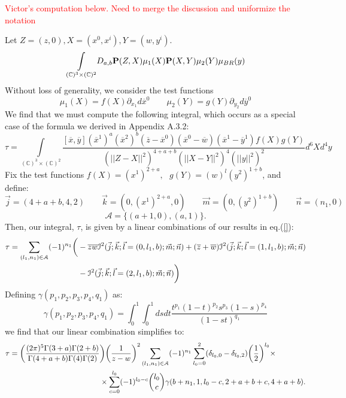 \documentclass[../main.tex]{subfiles}
\begin{document}
\textcolor{red}{Victor's computation below. Need to merge the discussion and uniformize the notation}

Let $Z = (z,0), X = (x^0, x^i), Y = (w, y^i) $.
\begin{equation}
    \underset{(\mathbb{C})^3 \times (\mathbb{C})^2}{\int} D_{a,b} \bold{P}(Z,X) \mu_1(X) \bold{P}(X,Y) \mu_2(Y) \mu_{BR}(y)
\end{equation}
Without loss of generality, we consider the test functions
\begin{equation}
    \mu_1(X) = f(X) \partial_{x_1} d\overline{x}^0 \quad \quad \mu_2(Y) = g(Y) \partial_{y_2} d\overline{y}^0
\end{equation}
We find that we must compute the following integral, which occurs as a special case of
the formula we derived in Appendix A.3.2:
\begin{equation}
    \tau = \underset{(\mathbb{C})^3 \times (\mathbb{C})^2}{\int} \frac{[\overline{x}, \overline{y}] (\overline{x}^1)^a (\overline{x}^2)^b (\overline{z}-\overline{x}^0) (\overline{x}^0 - \overline{w})(\overline{x}^1-\overline{y}^1) f(X) g(Y)}{(\vert \vert Z-
X \vert \vert^2)^{4+a+b}(\vert \vert X-Y \vert \vert^2)^4 (\vert \vert y \vert \vert^2)^2} d^6X d^4y
\end{equation}
Fix the test functions $f(X) = (x^1)^{2+a}, \text{ } g(Y) = (w)^l (y^2)^{1+b}$, and define:
\begin{equation}
    \vec{j} = (4+a+b,4,2) \quad \quad \vec{k} = (0,(x^1)^{2+a},0) \quad \quad \vec{m} = (0, (y^2)^{1+b}) \quad \quad \vec{n} = (n_1, 0) 
\end{equation}
\begin{equation}
    \mathcal{A} = \{ (a+1,0),(a,1)\}.
\end{equation}
Then, our integral, $\tau$, is given by a linear combinations of our results in eq.(\ref{}):
\begin{align} 
    \tau = \sum_{(l_1,n_1) \in \mathcal{A}} (-1)^{n_1} \bigg( &- \overline{z} \overline{w} \mathcal{I}^2(\vec{j};\vec{k}; \vec{l} = (0,l_1,b);\vec{m};\vec{n}) +(\overline{z}+\overline{w}) \mathcal{I}^2(\vec{j};\vec{k}; \vec{l} = (1,l_1,b);\vec{m};\vec{n}) \notag \\  &-\mathcal{I}^2(\vec{j};\vec{k}; \vec{l} = (2,l_1,b);\vec{m};\vec{n})\bigg) 
\end{align}
Defining $\gamma(p_1,p_2,p_3,p_4,q_1)$ as:
\begin{equation}
    \gamma(p_1,p_2,p_3,p_4,q_1) = \int_0^1 \int_0^1 ds dt \frac{t^{p_1} (1-t)^{p_2} s^{p_3} (1-s)^{p_4}}{(1-st)^{q_1}}
\end{equation}
we find that our linear combination simplifies to:
\begin{align}
    \tau = \bigg( \frac{(2\pi)^5 \Gamma(3+a) \Gamma(2+b)}{\Gamma(4+a+b) \Gamma(4) \Gamma(2)}&\bigg) \bigg( \frac{1}{z-w} \bigg)^2 \sum_{(l_1,n_1) \in \mathcal{A}} (-1)^{n_1} \sum_{l_0=0}^2 (\delta_{l_0,0}-\delta_{l_0,2}) \bigg(\frac{1}{2}\bigg)^{l_0} \times \\
    & \times \sum_{c=0}^{l_0} (-1)^{l_0-c} {l_0 \choose c} \gamma(b+n_1,1,l_0-c,2+a+b+c,4+a+b). \notag
\end{align}
\end{document}
